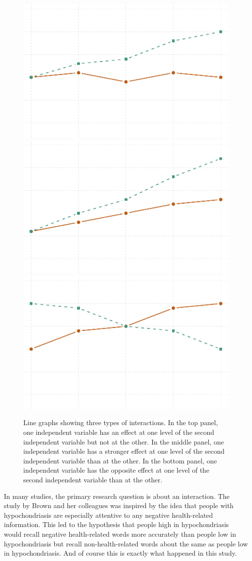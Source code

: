 \documentclass[
]{krantz}
\begin{document}
\begin{figure}

{\centering \includegraphics[width=0.51\linewidth]{08-complex-designs_files/figure-latex/lineinteractions-1} \includegraphics[width=0.51\linewidth]{08-complex-designs_files/figure-latex/lineinteractions-2} \includegraphics[width=0.51\linewidth]{08-complex-designs_files/figure-latex/lineinteractions-3} 

}

\caption{Line graphs showing three types of interactions. In the top panel, one independent variable has an effect at one level of the second independent variable but not at the other. In the middle panel, one independent variable has a stronger effect at one level of the second independent variable than at the other. In the bottom panel, one independent variable has the opposite effect at one level of the second independent variable than at the other.}\label{fig:lineinteractions}
\end{figure}

In many studies, the primary research question is about an interaction. The study by Brown and her colleagues was inspired by the idea that people with hypochondriasis are especially attentive to any negative health-related information. This led to the hypothesis that people high in hypochondriasis would recall negative health-related words more accurately than people low in hypochondriasis but recall non-health-related words about the same as people low in hypochondriasis. And of course this is exactly what happened in this study.
\end{document}
